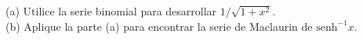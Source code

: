\item (a) Utilice la serie binomial para desarrollar $1/\sqrt{1+x^2}$. \\
    (b) Aplique la parte (a) para encontrar la serie de Maclaurin de $\text{senh}^{-1} x$.
